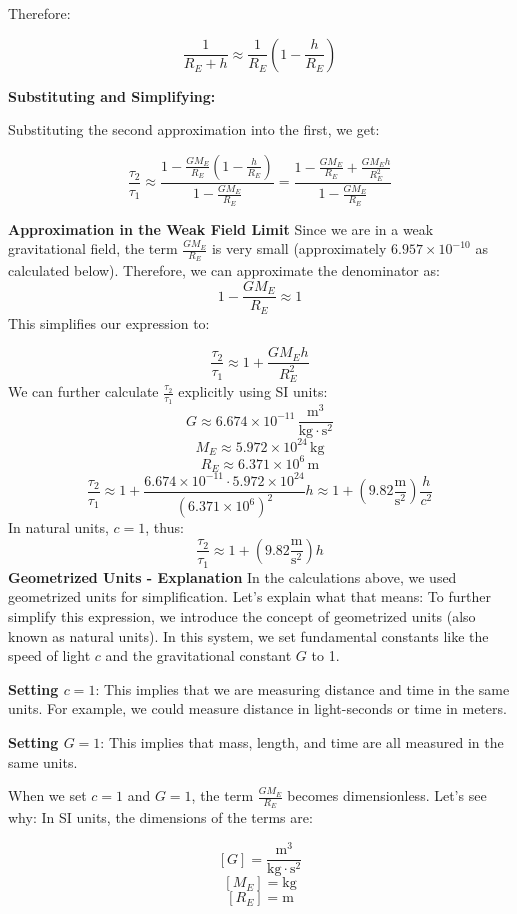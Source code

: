 Therefore:

\[
\frac{1}{R_E + h} \approx \frac{1}{R_E}\left(1 - \frac{h}{R_E}\right)
\]

\textbf{Substituting and Simplifying:}

Substituting the second approximation into the first, we get:

\[
\frac{\tau_2}{\tau_1} \approx \frac{1 - \frac{GM_E}{R_E}\left(1 - \frac{h}{R_E}\right)}{1 - \frac{GM_E}{R_E}} = \frac{1 - \frac{GM_E}{R_E} + \frac{GM_Eh}{R_E^2}}{1 - \frac{GM_E}{R_E}}
\]

\textbf{Approximation in the Weak Field Limit}
Since we are in a weak gravitational field, the term \(\frac{GM_E}{R_E}\) is very small (approximately \(6.957 \times 10^{-10}\) as calculated below). Therefore, we can approximate the denominator as:
\[
1-\frac{GM_E}{R_E} \approx 1
\]
This simplifies our expression to:

\[
\frac{\tau_2}{\tau_1} \approx 1 + \frac{GM_E h}{R_E^2}
\]
We can further calculate \(\frac{\tau_2}{\tau_1}\) explicitly using SI units:
\[
G \approx 6.674 \times 10^{-11} \, \frac{\mathrm{m^3}}{\mathrm{kg \cdot s^2}}
\]
\[
M_E \approx 5.972 \times 10^{24} \, \mathrm{kg}
\]
\[
R_E \approx 6.371 \times 10^6 \, \mathrm{m}
\]
\[
\frac{\tau_2}{\tau_1} \approx 1 + \frac{6.674 \times 10^{-11} \cdot 5.972 \times 10^{24}}{(6.371 \times 10^6)^2} h \approx 1 + (9.82 \frac{\mathrm{m}}{\mathrm{s^2}}) \frac{h}{c^2}
\]
In natural units, \(c=1\), thus:
\[
\frac{\tau_2}{\tau_1} \approx 1 + (9.82 \frac{\mathrm{m}}{\mathrm{s^2}})h
\]
\textbf{Geometrized Units - Explanation}
In the calculations above, we used geometrized units for simplification. Let's explain what that means:
To further simplify this expression, we introduce the concept of geometrized units (also known as natural units). In this system, we set fundamental constants like the speed of light \(c\) and the gravitational constant \(G\) to 1.

\textbf{Setting \(c = 1\)}: This implies that we are measuring distance and time in the same units. For example, we could measure distance in light-seconds or time in meters.

\textbf{Setting \(G = 1\)}: This implies that mass, length, and time are all measured in the same units.

When we set \(c=1\) and \(G=1\), the term \(\frac{GM_E}{R_E}\) becomes dimensionless. Let's see why:
In SI units, the dimensions of the terms are:

\[
[G] = \frac{\mathrm{m^3}}{\mathrm{kg \cdot s^2}}
\]
\[
[M_E] = \mathrm{kg}
\]
\[
[R_E] = \mathrm{m}
\]

